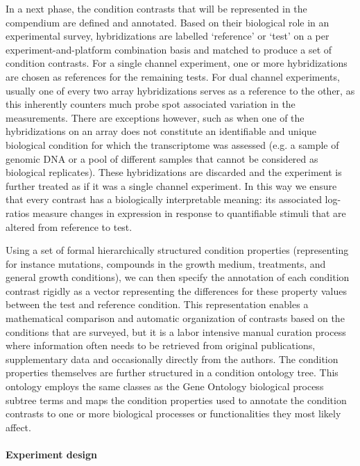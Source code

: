 In a next phase, the condition contrasts that will be represented in the
compendium are defined and annotated.
%
Based on their biological role in an experimental survey, hybridizations are
labelled `reference' or `test' on a per experiment-and-platform combination
basis and matched to produce a set of condition contrasts.
%
For a single channel experiment, one or more hybridizations are chosen as 
references for the remaining tests. 
%
For dual channel experiments, usually one of every two array hybridizations
serves as a reference to the other, as this inherently counters much probe spot
associated variation in the measurements.
%
There are exceptions however, such as when one of the hybridizations on an
array does not constitute an identifiable and unique biological condition for
which the transcriptome was assessed (e.g. a sample of genomic DNA or a pool of
different samples that cannot be considered as biological replicates).
%
These hybridizations are discarded and the experiment is further treated as if
it was a single channel experiment.
%
In this way we ensure that every contrast has a biologically interpretable
meaning: its associated log-ratios measure changes in expression in response to
quantifiable stimuli that are altered from reference to test.


Using a set of formal hierarchically structured condition properties
(representing for instance mutations, compounds in the growth medium,
treatments, and general growth conditions), we can then specify the annotation
of each condition contrast rigidly as a vector representing the differences for
these property values between the test and reference condition.
%
This representation enables a mathematical comparison and automatic
organization of contrasts based on the conditions that are surveyed, but it is
a labor intensive manual curation process where information often needs to be
retrieved from original publications, supplementary data and occasionally
directly from the authors.
%
The condition properties themselves are further structured in a condition
ontology tree.
%
This ontology employs the same classes as the Gene Ontology biological process
subtree terms \cite{Gene2010} and maps the condition properties used to
annotate the condition contrasts to one or more biological processes or
functionalities they most likely affect.



\paragraph{Experiment design}

